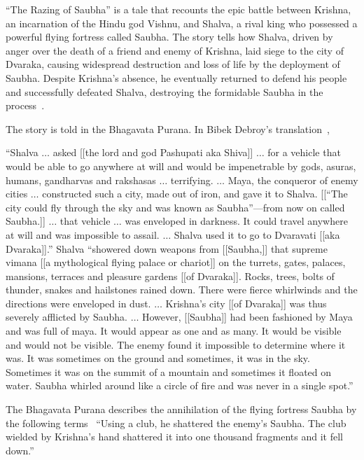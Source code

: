 ``The Razing of Saubha'' is a tale that recounts the epic battle between Krishna,
an incarnation of the Hindu god Vishnu,
and Shalva, a rival king who possessed a powerful flying fortress called Saubha.
The story tells how Shalva, driven by anger over the death of a friend and enemy of Krishna,
laid siege to the city of Dvaraka, causing widespread destruction and loss of life by the deployment of Saubha.
Despite Krishna's absence, he eventually returned to defend his people and successfully defeated Shalva,
destroying the formidable Saubha in the process~\cite{vanBuitenen1975,DebroyBhagavataPurana3}.


The story is told in the Bhagavata Purana. In Bibek Debroy's translation~\cite[Chapter~10(76)]{DebroyBhagavataPurana3},
\begin{svgraybox}
``Shalva $\ldots$ asked [[the lord and god Pashupati aka Shiva]] $\ldots$  for a vehicle that would be able to go anywhere at will and would be impenetrable by gods,
asuras, humans, gandharvas and rakshasas $\ldots$   terrifying.
$\ldots$
Maya, the conqueror of enemy cities $\ldots$
constructed such a city, made out of iron, and gave it to Shalva. [[``The city could fly through the sky and was known as Saubha''---from now on called Saubha.]]
$\ldots$ that vehicle $\ldots$ was enveloped in darkness. It could travel anywhere at will and was impossible to assail.
$\ldots$ Shalva used it to go to Dvaravati [[aka Dvaraka]].''
Shalva ``showered down weapons from [[Saubha,]] that supreme vimana [[a mythological flying palace or chariot]]
on the turrets, gates, palaces, mansions, terraces and pleasure gardens [[of Dvaraka]]. Rocks, trees, bolts of thunder, snakes and hailstones rained down.
There were fierce whirlwinds and the directions were enveloped in dust.
$\ldots$  Krishna's city [[of Dvaraka]] was thus severely afflicted by Saubha.   $\ldots$
However, [[Saubha]]
had been fashioned by Maya and was full of maya. It would appear as one and as many.
 It would be visible and would not be visible. The enemy found it impossible to determine where it was.
It was sometimes on the ground and sometimes, it was in the sky.
Sometimes it was on the summit of a mountain and sometimes it floated
on water. Saubha whirled around like a circle of fire and was never in a single spot.''
\end{svgraybox}
The Bhagavata Purana describes the annihilation of the flying fortress Saubha by the following terms~\cite[Chapter~10(77)]{DebroyBhagavataPurana3}
``Using a club, he shattered the enemy's Saubha. The club wielded by Krishna's hand shattered it into one thousand fragments and it fell down.''




